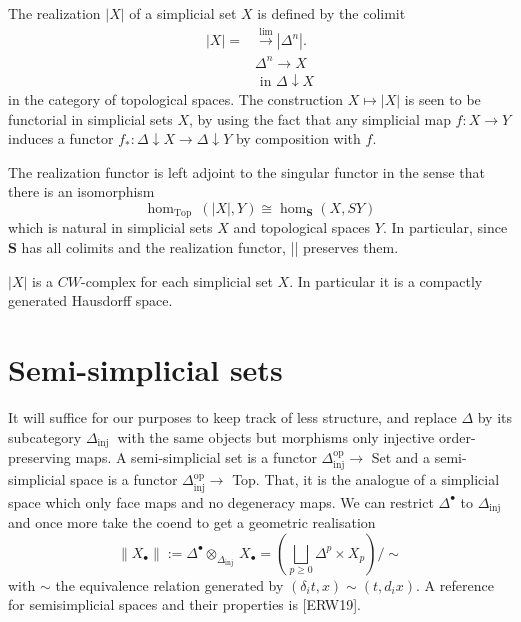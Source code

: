 The realization $|X|$ of a simplicial set $X$ is defined by the colimit
$$
\begin{aligned}
|X|= & \xrightarrow{\lim }\left|\Delta^n\right| . \\
& \Delta^n \rightarrow X \\
& \text { in } \Delta \downarrow X
\end{aligned}
$$
in the category of topological spaces. The construction $X \mapsto|X|$ is seen to be functorial in simplicial sets $X$, by using the fact that any simplicial map $f: X \rightarrow Y$ induces a functor $f_*: \Delta \downarrow X \rightarrow \Delta \downarrow Y$ by composition with $f$.

\begin{prop}
    The realization functor is left adjoint to the singular functor in the sense that there is an isomorphism
$$
\operatorname{hom}_{\text {Top }}(|X|, Y) \cong \operatorname{hom}_{\mathbf{S}}(X, S Y)
$$
which is natural in simplicial sets $X$ and topological spaces $Y$. In particular, since $\mathbf{S}$ has all colimits and the realization functor, || preserves them.
\end{prop} 

\begin{prop}
    $|X|$ is a $C W$-complex for each simplicial set $X$. In particular it is a compactly generated Hausdorff space.
\end{prop}

\section{Semi-simplicial sets}

It will suffice for our purposes to keep track of less structure, and replace $\Delta$ by its subcategory $\Delta_{\text {inj }}$ with the same objects but morphisms only injective order-preserving maps. A semi-simplicial set is a functor $\Delta_{\mathrm{inj}}^{\mathrm{op}} \rightarrow$ Set and a semi-simplicial space is a functor $\Delta_{\mathrm{inj}}^{\mathrm{op}} \rightarrow$ Top. That, it is the analogue of a simplicial space which only face maps and no degeneracy maps. We can restrict $\Delta^{\bullet}$ to $\Delta_{\text {inj }}$ and once more take the coend to get a geometric realisation
$$
\left\|X_{\bullet}\right\|:=\Delta^{\bullet} \otimes_{\Delta_{\text {inj }}} X_{\bullet}=\left(\bigsqcup_{p \geq 0} \Delta^p \times X_p\right) / \sim
$$
with $\sim$ the equivalence relation generated by $\left(\delta_i t, x\right) \sim\left(t, d_i x\right)$. A reference for semisimplicial spaces and their properties is [ERW19].

